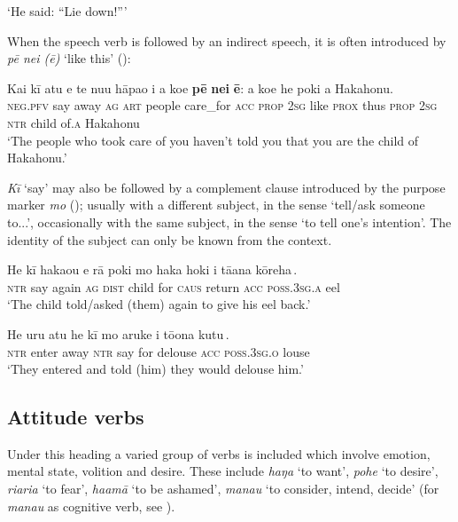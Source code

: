 \glt
‘He said: “Lie down!”’ \textstyleExampleref{[Ley-5-28a.003]}
\z

When the speech verb is followed by an indirect speech, it is often introduced by \textit{pē nei (ē)} ‘like this’ ():

\ea\label{ex:11.67}
\gll Kai kī atu e te nu{\ꞌ}u hāpa{\ꞌ}o i a koe \textbf{pē} \textbf{nei} \textbf{ē}: a koe he poki {\ꞌ}a Hakahonu.\\
\textsc{neg.pfv} say away \textsc{ag} \textsc{art} people care\_for \textsc{acc} \textsc{prop} \textsc{2sg} like \textsc{prox} thus \textsc{prop} \textsc{2sg} \textsc{ntr} child of\textsc{.a} Hakahonu\\

\glt 
‘The people who took care of you haven’t told you that you are the child of Hakahonu.’ \textstyleExampleref{[R427.016]} 
\z

\textit{Kī} ‘say’ may also be followed by a complement clause introduced by the purpose marker \textit{mo} (); usually with a different subject, in the sense ‘tell/ask someone to...’, occasionally with the same subject, in the sense ‘to tell one’s intention’. The identity of the subject can only be known from the context.

\ea\label{ex:11.68}
\gll He kī haka{\ꞌ}ou e rā poki {\ob}mo haka hoki i tā{\ꞌ}ana kōreha\,{\cb}. \\
\textsc{ntr} say again \textsc{ag} \textsc{dist} child {\db}for \textsc{caus} return \textsc{acc} \textsc{poss.3sg.a} eel \\
\glt 
‘The child told/asked (them) again to give his eel back.’ \textstyleExampleref{[R532-10.014]}
\z

\ea\label{ex:11.69}
\gll He uru atu he kī {\ob}mo {\ꞌ}aruke i tō{\ꞌ}ona kutu\,{\cb}. \\
\textsc{ntr} enter away \textsc{ntr} say {\db}for delouse \textsc{acc} \textsc{poss.3sg.o} louse \\

\glt 
‘They entered and told (him) they would delouse him.’ \textstyleExampleref{[R310.030]} 
\z
{}
\subsection{Attitude verbs}\label{sec:11.3.5}

Under this heading a varied group of verbs is included which involve emotion, mental state, volition and desire. These include \textit{haŋa} ‘to want’, \textit{pohe} ‘to desire’, \textit{\mbox{ri{\ꞌ}ari{\ꞌ}a}} ‘to fear’, \textit{ha{\ꞌ}amā} ‘to be ashamed’, \textit{mana{\ꞌ}u} ‘to consider, intend, decide’ (for \textit{mana{\ꞌ}u} as cognitive verb, see ).

